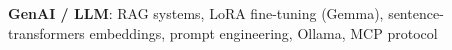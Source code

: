 \item \textbf{GenAI / LLM}: RAG systems, LoRA fine-tuning (Gemma), sentence-transformers embeddings, prompt engineering, Ollama, MCP protocol
